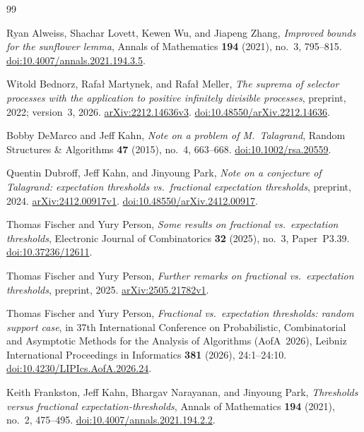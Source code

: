 \begin{thebibliography}{99}

Ryan Alweiss, Shachar Lovett, Kewen Wu, and Jiapeng Zhang,
\emph{Improved bounds for the sunflower lemma},
Annals of Mathematics \textbf{194} (2021), no.~3, 795--815.
\href{https://doi.org/10.4007/annals.2021.194.3.5}{doi:10.4007/annals.2021.194.3.5}.

Witold Bednorz, Rafa{\l} Martynek, and Rafa{\l} Meller,
\emph{The suprema of selector processes with the application to positive
infinitely divisible processes},
preprint, 2022; version~3, 2026.
\href{https://arxiv.org/abs/2212.14636v3}{arXiv:2212.14636v3}.
\href{https://doi.org/10.48550/arXiv.2212.14636}{doi:10.48550/arXiv.2212.14636}.

Bobby DeMarco and Jeff Kahn,
\emph{Note on a problem of M.~Talagrand},
Random Structures \& Algorithms \textbf{47} (2015), no.~4, 663--668.
\href{https://doi.org/10.1002/rsa.20559}{doi:10.1002/rsa.20559}.

Quentin Dubroff, Jeff Kahn, and Jinyoung Park,
\emph{Note on a conjecture of Talagrand: expectation thresholds
vs.\ fractional expectation thresholds},
preprint, 2024.
\href{https://arxiv.org/abs/2412.00917v1}{arXiv:2412.00917v1}.
\href{https://doi.org/10.48550/arXiv.2412.00917}{doi:10.48550/arXiv.2412.00917}.

Thomas Fischer and Yury Person,
\emph{Some results on fractional vs.\ expectation thresholds},
Electronic Journal of Combinatorics \textbf{32} (2025), no.~3, Paper~P3.39.
\href{https://doi.org/10.37236/12611}{doi:10.37236/12611}.

Thomas Fischer and Yury Person,
\emph{Further remarks on fractional vs.\ expectation thresholds},
preprint, 2025.
\href{https://arxiv.org/abs/2505.21782v1}{arXiv:2505.21782v1}.

Thomas Fischer and Yury Person,
\emph{Fractional vs.\ expectation thresholds: random support case},
in 37th International Conference on Probabilistic, Combinatorial and
Asymptotic Methods for the Analysis of Algorithms (AofA~2026),
Leibniz International Proceedings in Informatics \textbf{381} (2026), 24:1--24:10.
\href{https://doi.org/10.4230/LIPIcs.AofA.2026.24}{doi:10.4230/LIPIcs.AofA.2026.24}.

Keith Frankston, Jeff Kahn, Bhargav Narayanan, and Jinyoung Park,
\emph{Thresholds versus fractional expectation-thresholds},
Annals of Mathematics \textbf{194} (2021), no.~2, 475--495.
\href{https://doi.org/10.4007/annals.2021.194.2.2}{doi:10.4007/annals.2021.194.2.2}.


\end{thebibliography}
